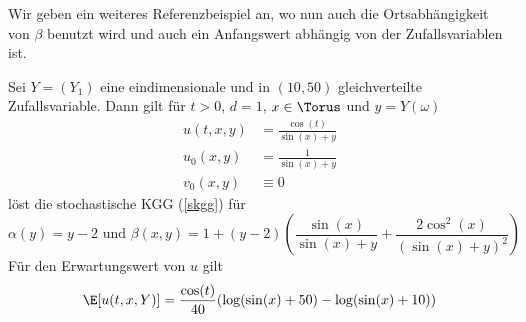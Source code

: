 Wir geben ein weiteres Referenzbeispiel an, wo nun auch die Ortsabhängigkeit von $\beta$ benutzt wird und auch ein Anfangswert abhängig von der Zufallsvariablen ist.
\begin{mathdef}
Sei $Y=(Y_1)$ eine eindimensionale und in $(10,50)$ gleichverteilte Zufallsvariable. Dann gilt für $t>0$, $d=1$, $x\in\Torus$ und $y=Y(\omega)$
\begin{align*}
u(t,x,y)&=\frac{\cos(t)}{\sin(x) + y}\\
u_0(x,y)&=\frac{1}{\sin(x) + y}\\
v_0(x,y)&\equiv 0
\end{align*}
löst die stochastische KGG (\ref{skgg}) für \[\alpha(y)=y-2\text{  und  }\beta(x,y)=1 + (y-2)\left(\frac{\sin(x)}{\sin(x) + y}+ \frac{2\cos^2(x)}{(\sin(x) + y)^2}\right)\]
Für den Erwartungswert von $u$ gilt
\[\E[u(t,x,Y)]=\frac{\cos(t)}{40}(\log(\sin(x) + 50)- \log(\sin(x) + 10))\]
\end{mathdef}
